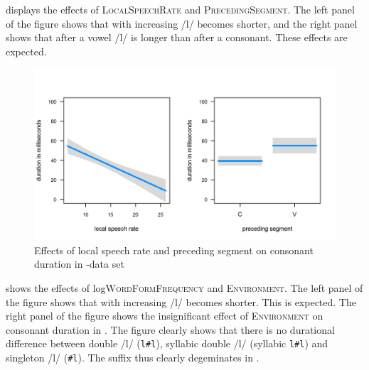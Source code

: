  displays the effects of \textsc{LocalSpeechRate} and \textsc{PrecedingSegment}. The left panel of the figure shows that with increasing  /l/ becomes shorter, and the right panel shows that after a vowel /l/ is longer than after a consonant. These effects are expected.





\begin{figure}
	
		
	\includegraphics[scale=.8] {images/Corpus/lyModelcov.png}
	\caption{Effects of local speech rate and preceding segment on consonant duration in -data set}
	\label{fig:corpus covariates ly}
\end{figure}





 shows the effects of log\textsc{WordFormFrequency} and \textsc{Environment}.
The left panel of the figure shows that with increasing  /l/ becomes shorter. This is expected.
The right panel of the figure shows the insignificant effect of \textsc{Environment} on consonant duration in . The figure clearly shows that there is no durational difference between double /l/ (\texttt{l\#l}), syllabic double /l/ (syllabic \texttt{l\#l}) and singleton /l/ (\texttt{\#l}). The suffix  thus clearly degeminates in . 


